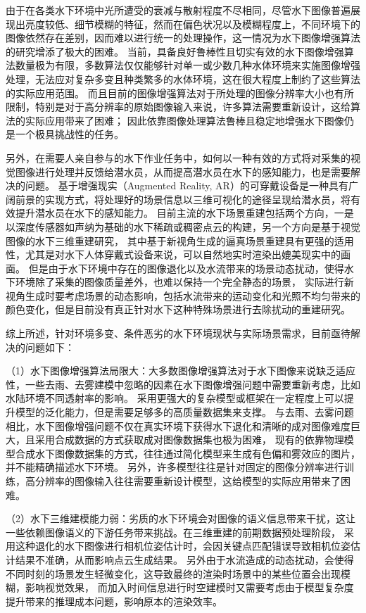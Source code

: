 由于在各类水下环境中光所遭受的衰减与散射程度不尽相同，尽管水下图像普遍展现出亮度较低、细节模糊的特征，然而在偏色状况以及模糊程度上，不同环境下的图像依然存在差别，因而难以进行统一的处理操作，这一情况为水下图像增强算法的研究增添了极大的困难。
当前，具备良好鲁棒性且切实有效的水下图像增强算法数量极为有限，多数算法仅仅能够针对单一或少数几种水体环境来实施图像增强处理，无法应对复杂多变且种类繁多的水体环境，这在很大程度上制约了这些算法的实际应用范围。
而且目前的图像增强算法对于所处理的图像分辨率大小也有所限制，特别是对于高分辨率的原始图像输入来说，许多算法需要重新设计，这给算法的实际应用带来了困难；
因此依靠图像处理算法鲁棒且稳定地增强水下图像仍是一个极具挑战性的任务。

另外，在需要人亲自参与的水下作业任务中，如何以一种有效的方式将对采集的视觉图像进行处理并反馈给潜水员，从而提高潜水员在水下的感知能力，也是需要解决的问题。\cite{underwater_perception}
基于增强现实（Augmented Reality, AR）的可穿戴设备是一种具有广阔前景的实现方式，将处理好的场景信息以三维可视化的途径呈现给潜水员，将有效提升潜水员在水下的感知能力。
目前主流的水下场景重建包括两个方向，一是以深度传感器如声纳为基础的水下稀疏或稠密点云的构建，另一个方向是基于视觉图像的水下三维重建研究，
其中基于新视角生成的逼真场景重建具有更强的适用性，尤其是对水下人体穿戴式设备来说，可以自然地实时渲染出媲美现实中的画面。
但是由于水下环境中存在的图像退化以及水流带来的场景动态扰动，使得水下环境除了采集的图像质量差外，也难以保持一个完全静态的场景，
实际进行新视角生成时要考虑场景的动态影响，包括水流带来的运动变化和光照不均匀带来的颜色变化，但是目前没有真正针对水下这种特殊场景进行去除扰动的重建研究。

综上所述，针对环境多变、条件恶劣的水下环境现状与实际场景需求，目前亟待解决的问题如下：

（1）水下图像增强算法局限大：大多数图像增强算法对于水下图像来说缺乏适应性，一些去雨、去雾建模中忽略的因素在水下图像增强问题中需要重新考虑，比如水陆环境不同透射率的影响。
采用更强大的复杂模型或框架在一定程度上可以提升模型的泛化能力，但是需要足够多的高质量数据集来支撑。
与去雨、去雾问题相比，水下图像增强问题不仅在真实环境下获得水下退化和清晰的成对图像难度巨大，且采用合成数据的方式获取成对图像数据集也极为困难，
现有的依靠物理模型合成水下图像数据集的方式，往往通过简化模型来生成有色偏和雾效应的图片，并不能精确描述水下环境。
另外，许多模型往往是针对固定的图像分辨率进行训练，高分辨率的图像输入往往需要重新设计模型，这给模型的实际应用带来了困难。

（2）水下三维建模能力弱：劣质的水下环境会对图像的语义信息带来干扰，这让一些依赖图像语义的下游任务带来挑战。在三维重建的前期数据预处理阶段，
采用这种退化的水下图像进行相机位姿估计时，会因关键点匹配错误导致相机位姿估计结果不准确，从而影响点云生成结果。
另外由于水流造成的动态扰动，会使得不同时刻的场景发生轻微变化，这导致最终的渲染时场景中的某些位置会出现模糊，影响视觉效果，
而加入时间信息进行时空建模时又需要考虑由于模型复杂度提升带来的推理成本问题，影响原本的渲染效率。

